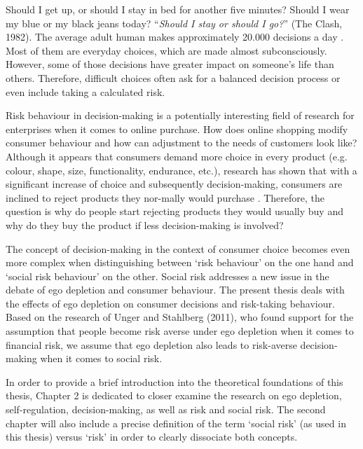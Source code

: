 \onehalfspacing
Should I get up, or should I stay in bed for another five minutes? Should I wear my blue or my black jeans today? “\emph{Should I stay or should I go?}” (The Clash, 1982). The average adult human makes approximately 20.000 decisions a day \citep{toennemann2008}. Most of them are everyday choices, which are made almost subconsciously. However, some of those decisions have greater impact on someone’s life than others. Therefore, difficult choices often ask for a balanced decision process or even include taking a calculated risk.\par
Risk behaviour in decision-making is a potentially interesting field of research for enterprises \citep{baumeister2002yielding} when it comes to online purchase. How does online shopping modify consumer behaviour and how can adjustment to the needs of customers look like? Although it appears that consumers demand more choice in every product (e.g. colour, shape, size, functionality, endurance, etc.), research has shown that with a significant increase of choice and subsequently decision-making, consumers are inclined to reject products they nor-mally would purchase \citep{greifeneder2010less,levav2010order}. Therefore, the question is why do people start rejecting products they would usually buy and why do they buy the product if less decision-making is involved?\par
The concept of decision-making in the context of consumer choice becomes even more complex when distinguishing between ‘risk behaviour’ on the one hand and ‘social risk behaviour’ on the other. Social risk addresses a new issue in the debate of ego depletion and consumer behaviour. The present thesis deals with the effects of ego depletion on consumer decisions and risk-taking behaviour. Based on the research of Unger and Stahlberg (2011), who found support for the assumption that people become risk averse under ego depletion when it comes to financial risk, we assume that ego depletion also leads to risk-averse decision-making when it comes to social risk.\par
In order to provide a brief introduction into the theoretical foundations of this thesis, Chapter 2 is dedicated to closer examine the research on ego depletion, self-regulation, decision-making, as well as risk and social risk. The second chapter will also include a precise definition of the term ‘social risk’ (as used in this thesis) versus ‘risk’ in order to clearly dissociate both concepts. \par
